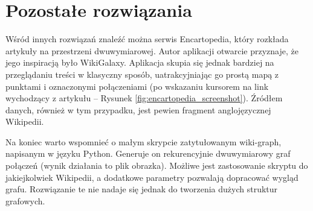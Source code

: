 \section{Pozostałe rozwiązania}

Wśród innych rozwiązań znaleźć można serwis Encartopedia\cite{Encartopedia}, który rozkłada artykuły na przestrzeni dwuwymiarowej. Autor aplikacji otwarcie przyznaje, że jego inspiracją było WikiGalaxy. Aplikacja skupia się jednak bardziej na przeglądaniu treści w klasyczny sposób, uatrakcyjniając go prostą mapą z punktami i oznaczonymi połączeniami (po wskazaniu kursorem na link wychodzący z artykułu – Rysunek \ref{fig:encartopedia_screenshot}). Źródłem danych, również w tym przypadku, jest pewien fragment anglojęzycznej Wikipedii.


Na koniec warto wspomnieć o małym skrypcie zatytułowanym wiki-graph\cite{WikiGraphPython}, napisanym w języku Python. Generuje on rekurencyjnie dwuwymiarowy graf połączeń (wynik działania to plik obrazka). Możliwe jest zastosowanie skryptu do jakiejkolwiek Wikipedii, a dodatkowe parametry pozwalają dopracować wygląd grafu. Rozwiązanie te nie nadaje się jednak do tworzenia dużych struktur grafowych.